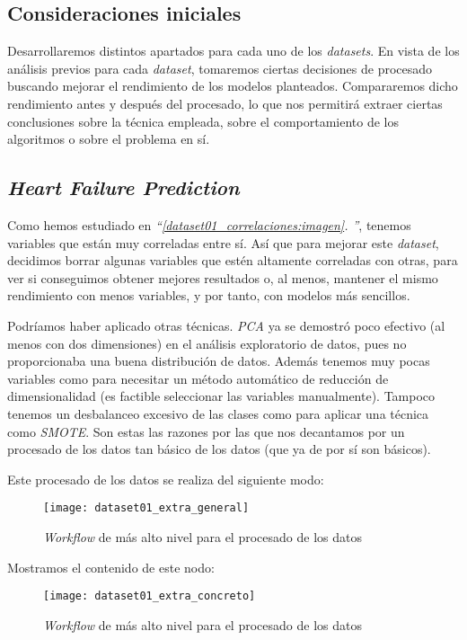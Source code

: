 \documentclass[11pt]{article}
\newcommand{\customcite}[1]{\emph{``\ref{#1}. \nameref{#1}''}}
\begin{document}
\subsection{Consideraciones iniciales}

Desarrollaremos distintos apartados para cada uno de los \emph{datasets}. En vista de los análisis previos para cada \emph{dataset}, tomaremos ciertas decisiones de procesado buscando mejorar el rendimiento de los modelos planteados. Compararemos dicho rendimiento antes y después del procesado, lo que nos permitirá extraer ciertas conclusiones sobre la técnica empleada, sobre el comportamiento de los algoritmos o sobre el problema en sí.

\subsection{\emph{Heart Failure Prediction}} \label{dataset01_procesado_datos:seccion}

Como hemos estudiado en \customcite{dataset01_correlaciones:imagen}, tenemos variables que están muy correladas entre sí. Así que para mejorar este \emph{dataset}, decidimos borrar algunas variables que estén altamente correladas con otras, para ver si conseguimos obtener mejores resultados o, al menos, mantener el mismo rendimiento con menos variables, y por tanto, con modelos más sencillos.

Podríamos haber aplicado otras técnicas. \emph{PCA} ya se demostró poco efectivo (al menos con dos dimensiones) en el análisis exploratorio de datos, pues no proporcionaba una buena distribución de datos. Además tenemos muy pocas variables como para necesitar un método automático de reducción de dimensionalidad (es factible seleccionar las variables manualmente). Tampoco tenemos un desbalanceo excesivo de las clases como para aplicar una técnica como \emph{SMOTE}. Son estas las razones por las que nos decantamos por un procesado de los datos tan básico de los datos (que ya de por sí son básicos).

Este procesado de los datos se realiza del siguiente modo:

\begin{figure}[H]
    \centering
    \texttt{[image: dataset01\_extra\_general]}
    \caption{\emph{Workflow} de más alto nivel para el procesado de los datos}
\end{figure}

Mostramos el contenido de este nodo:

\begin{figure}[H]
    \centering
    \texttt{[image: dataset01\_extra\_concreto]}
    \caption{\emph{Workflow} de más alto nivel para el procesado de los datos}
\end{figure}
\end{document}
